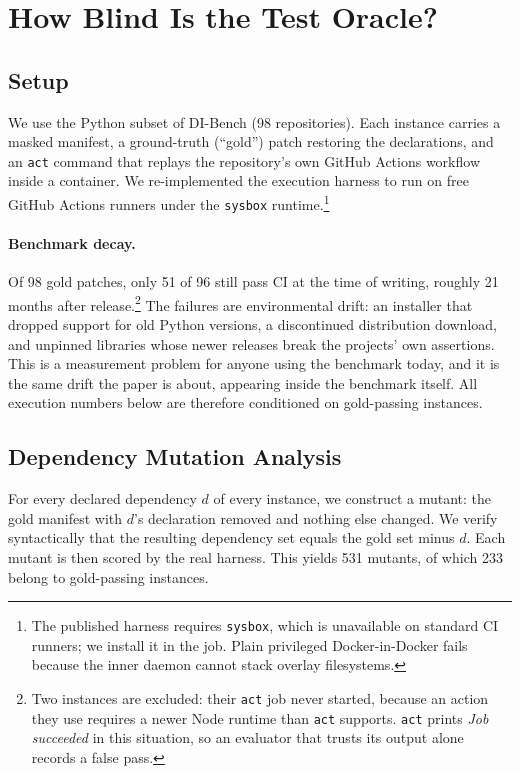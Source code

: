 \documentclass[11pt]{article}
\newcommand{\dibench}{DI-Bench}
\newcommand{\code}[1]{\texttt{\small #1}}
\begin{document}
\section{How Blind Is the Test Oracle?}
\label{sec:blindness}

\subsection{Setup}

We use the Python subset of \dibench{} (98 repositories).
Each instance carries a masked manifest, a ground-truth (``gold'') patch restoring the declarations, and an \code{act} command that replays the repository's own GitHub Actions workflow inside a container.
We re-implemented the execution harness to run on free GitHub Actions runners under the \code{sysbox} runtime.\footnote{The published harness requires \code{sysbox}, which is unavailable on standard CI runners; we install it in the job. Plain privileged Docker-in-Docker fails because the inner daemon cannot stack overlay filesystems.}

\paragraph{Benchmark decay.}
Of 98 gold patches, only 51 of 96 still pass CI at the time of writing, roughly 21 months after release.\footnote{Two instances are excluded: their \code{act} job never started, because an action they use requires a newer Node runtime than \code{act} supports. \code{act} prints \emph{Job succeeded} in this situation, so an evaluator that trusts its output alone records a false pass.}
The failures are environmental drift: an installer that dropped support for old Python versions, a discontinued distribution download, and unpinned libraries whose newer releases break the projects' own assertions.
This is a measurement problem for anyone using the benchmark today, and it is the same drift the paper is about, appearing inside the benchmark itself.
All execution numbers below are therefore conditioned on gold-passing instances.

\subsection{Dependency Mutation Analysis}

For every declared dependency $d$ of every instance, we construct a mutant: the gold manifest with $d$'s declaration removed and nothing else changed.
We verify syntactically that the resulting dependency set equals the gold set minus $d$.
Each mutant is then scored by the real harness.
This yields 531 mutants, of which 233 belong to gold-passing instances.
\end{document}
